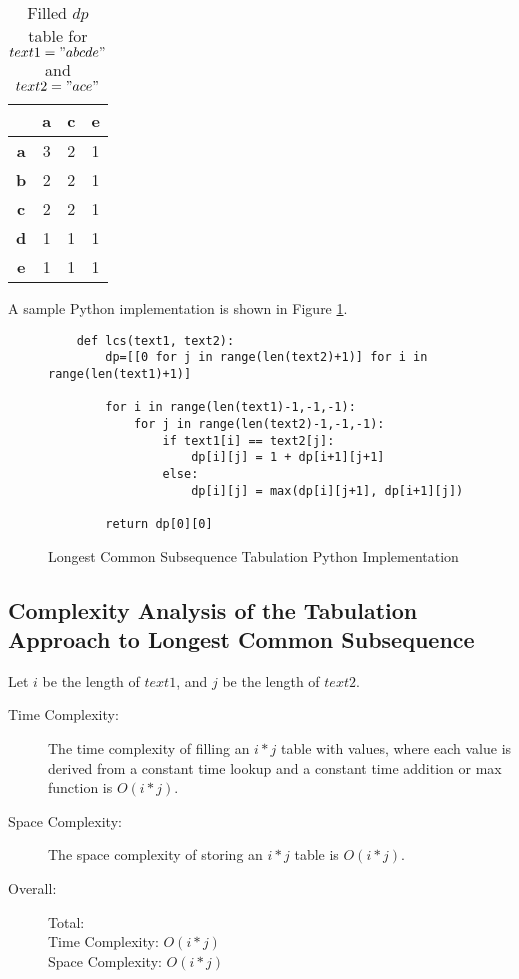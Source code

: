 \begin{table}[htbp]
    \centering
    \begin{tabular}{|c|c|c|c|}
        \hline
          & \textbf{a} & \textbf{c} & \textbf{e} \\
        \hline
        \textbf{a} & 3 & 2 & 1 \\
        \hline
        \textbf{b} & 2 & 2 & 1  \\
        \hline
        \textbf{c} & 2 & 2 & 1  \\
        \hline
        \textbf{d} & 1 & 1 & 1 \\
        \hline
        \textbf{e} & 1 & 1 & 1  \\
        \hline
    \end{tabular}
    \label{tab:lcs-dp-table}
    \caption{Filled $dp$ table for $text1="abcde"$ and $text2="ace"$}
\end{table}


A sample Python implementation is shown in Figure \ref{fig:lcs-dp}.

\begin{figure}[H]
    \centering
    \begin{lstlisting}
    def lcs(text1, text2):
        dp=[[0 for j in range(len(text2)+1)] for i in range(len(text1)+1)]
    
        for i in range(len(text1)-1,-1,-1):
            for j in range(len(text2)-1,-1,-1):
                if text1[i] == text2[j]:
                    dp[i][j] = 1 + dp[i+1][j+1]
                else:
                    dp[i][j] = max(dp[i][j+1], dp[i+1][j])
    
        return dp[0][0]
    \end{lstlisting}
    \caption{Longest Common Subsequence Tabulation Python Implementation}
    \label{fig:lcs-dp}
\end{figure}

\subsection{Complexity Analysis of the Tabulation Approach to Longest Common Subsequence}\label{subsec:ca-lcs-dp}

Let $i$ be the length of $text1$, and $j$ be the length of $text2$.

\begin{description}
    \item[Time Complexity:]
        The time complexity of filling an $i * j$ table with values, where each value is derived from a constant time lookup and a constant time addition or max function is $O(i * j)$.

    \item[Space Complexity:] 
        The space complexity of storing an $i * j$ table is $O(i * j)$.

        
    \item[Overall:] Total:\\
        Time Complexity: $O(i * j)$\\
        Space Complexity: $O(i * j)$
    
\end{description}

